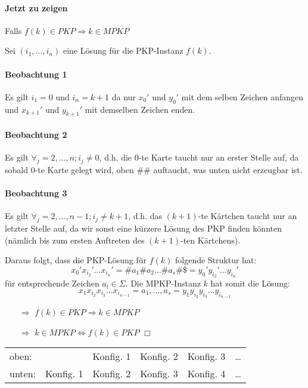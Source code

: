 \paragraph*{Jetzt zu zeigen} Falls $f(k) \in PKP \Rightarrow k \in MPKP$

\par\medskip Sei $(i_1,\dots,i_n)$ eine Lösung für die PKP-Instanz $f(k)$.

\paragraph*{Beobachtung 1} Es gilt $i_1=0$ und $i_n=k+1$ da nur $x_0'$ und $y_0'$ mit dem selben Zeichen anfangen und $x_{k+1}'$ und $y_{k+1}'$ mit demselben Zeichen enden.

\paragraph*{Beobachtung 2} Es gilt $\forall_j=2,\dots,n; i_j \not=0$, d.h. die 0-te Karte taucht nur an erster Stelle auf, da sobald 0-te Karte gelegt wird, oben \#\# auftaucht, was unten nicht erzeugbar ist.

\paragraph*{Beobachtung 3} Es gilt $\forall_j=2,\dots,n-1; i_j \not= k+1$, d.h. das $(k+1)$-te Kärtchen taucht nur an letzter Stelle auf, da wir sonst eine kürzere Lösung des PKP finden könnten (nämlich bis zum ersten Auftreten des $(k+1)$-ten Kärtchens).

\par\medskip Daraus folgt, dass die PKP-Lösung für $f(k)$ folgende Struktur hat: $$ x_0'x_{i_2}'\dots x_{i_n}' = \#a_1\#a_2\dots\#a_s\#\$ = y_0'y_{i_2}'\dots y_{i_n}' $$ für entsprechende Zeichen $a_l \in \Sigma$. Die MPKP-Instanz $k$ hat somit die Lösung: $$ x_1x_{i_2}x_{i_3}\dots x_{i_{n-1}} = a_1,\dots,a_s = y_1y_{i_2}y_{i_3}\dots y_{i_{n-1}} $$
\begin{itemize}
	\item[$\Rightarrow$] $f(k) \in PKP \Rightarrow k \in MPKP$
	\item[$\Rightarrow$] $k \in MPKP \Leftrightarrow f(k) \in PKP$ $\Box$
\end{itemize}


\begin{table}[htb!]
\begin{tabular}{l|l l l l l}
oben: & & Konfig. 1 & Konfig. 2 & Konfig. 3 & \dots \\
unten: & Konfig. 1 & Konfig. 2 & Konfig. 3 & Konfig. 4 & \dots \\
\end{tabular}
\end{table}

